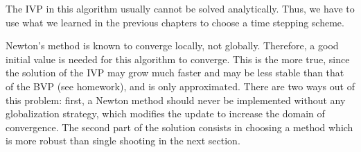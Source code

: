 



\begin{remark}
  The IVP in this algorithm usually cannot be solved
  analytically. Thus, we have to use what we learned in the previous
  chapters to choose a time stepping scheme.

  Newton's method is known to converge locally, not
  globally. Therefore, a good initial value is needed for this
  algorithm to converge. This is the more true, since the solution of
  the IVP may grow much faster and may be less stable than that of the
  BVP (see homework), and is only approximated. There are two ways out
  of this problem: first, a Newton method should never be implemented
  without any globalization strategy, which modifies the update to
  increase the domain of convergence. The second part of the solution
  consists in choosing a method which is more robust than single
  shooting in the next section.
\end{remark}

